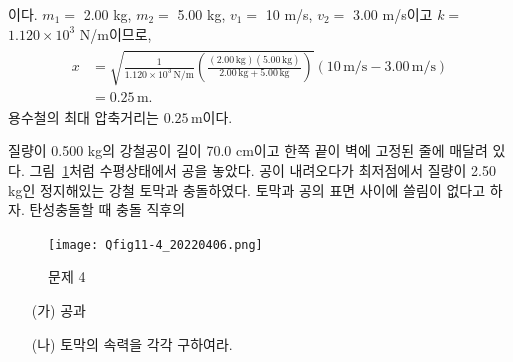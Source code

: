 \documentclass[floatfix,nofootinbib,superscriptaddress,fleqn]{revtex4-2}
\begin{document}
이다. $m_1=$ 2.00 kg, $m_2=$ 5.00 kg, $v_1=$ 10 m/s, $v_2=$ 3.00 m/s이고 
$k=$ $1.120\times 10^3$ N/m이므로,
\begin{align}
  \begin{split}
    x &= \sqrt{\frac{1}{1.120\times 10^3\,\mathrm{N/m}}\left(
      \frac{(2.00\,\mathrm{kg})(5.00\,\mathrm{kg})}
      {2.00\,\mathrm{kg}+5.00\,\mathrm{kg}}
      \right)}(10\,\mathrm{m/s}-3.00\,\mathrm{m/s}) \\
      &= 0.25\,\mathrm{m}.
  \end{split}
\end{align}
용수철의 최대 압축거리는 $0.25\,\mathrm{m}$이다.
\vspace{1cm}

질량이 0.500 kg의 강철공이 길이 70.0 cm이고 한쪽 끝이 벽에 고정된 줄에
매달려 있다. 그림~\ref{fig:4}처럼 수평상태에서 공을 놓았다. 공이
내려오다가 최저점에서 질량이 2.50 kg인 정지해있는 강철 토막과
충돌하였다. 토막과 공의 표면 사이에 쓸림이 없다고 하자. 
탄성충돌할 때 충돌 직후의 
\begin{figure}[ht]
  \centering
  \texttt{[image: Qfig11-4\_20220406.png]}
  \caption{문제 4}
  \label{fig:4}
\end{figure}
\begin{itemize}
\item[(가)] 공과 
\item[(나)] 토막의 속력을 각각 구하여라. 
\end{itemize}
\end{document}
